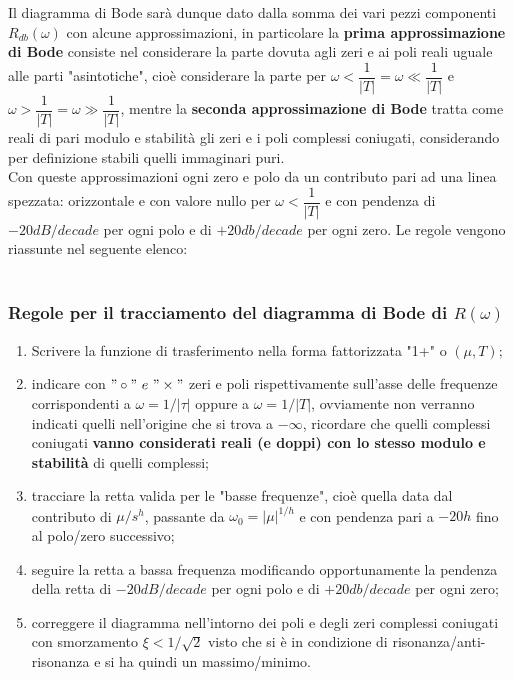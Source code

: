 \documentclass[a4paper]{article}
\begin{document}
	Il diagramma di Bode sarà dunque dato dalla somma dei vari pezzi componenti $R_{db}(\omega)$ con alcune approssimazioni, in particolare la \textbf{prima approssimazione di Bode} consiste nel considerare la parte dovuta agli zeri e ai poli reali uguale alle parti "asintotiche", cioè considerare la parte per $\omega<\dfrac{1}{|T|}=\omega\ll\dfrac{1}{|T|}$ e $\omega>\dfrac{1}{|T|}=\omega\gg\dfrac{1}{|T|}$, mentre la \textbf{seconda approssimazione di Bode} tratta come reali di pari modulo e stabilità gli zeri e i poli complessi coniugati, considerando per definizione stabili quelli immaginari puri.
	\\Con queste approssimazioni ogni zero e polo da un contributo pari ad una linea spezzata: orizzontale e con valore nullo per $\omega<\dfrac{1}{|T|}$ e con pendenza di $-20dB/decade$ per ogni polo e di $+20db/decade$ per ogni zero. Le regole vengono riassunte nel seguente elenco:\\\\

	\subsubsection{Regole per il tracciamento del diagramma di Bode di $R(\omega)$}
	
	\begin{enumerate}
		\item Scrivere la funzione di trasferimento nella forma fattorizzata "1+" o $(\mu,T)$;
		
		
		\item indicare con $"\circ" \,\,e\,\,"\times"$ zeri e poli rispettivamente sull'asse delle frequenze corrispondenti a $\omega=1/|\tau|$ oppure a $\omega=1/|T|$, ovviamente non verranno indicati quelli nell'origine che si trova a $-\infty$, ricordare che quelli complessi coniugati \textbf{vanno considerati reali (e doppi) con lo stesso modulo e stabilità} di quelli complessi;
		 
		
		\item tracciare la retta valida per le "basse frequenze", cioè quella data dal contributo di $\mu/s^h$, passante da $\omega_0=|\mu|^{1/h}$ e con pendenza pari a $-20h$ fino al polo/zero successivo;
		
		
		\item seguire la retta a bassa frequenza modificando opportunamente la pendenza della retta di $-20dB/decade$ per ogni polo e di $+20db/decade$ per ogni zero;
		
		
		\item correggere il diagramma nell'intorno dei poli e degli zeri complessi coniugati con smorzamento $\xi<1/\sqrt{2}$ visto che si è in condizione di risonanza/anti-risonanza e si ha quindi un massimo/minimo.
		
		
	\end{enumerate}
	
\end{document}
